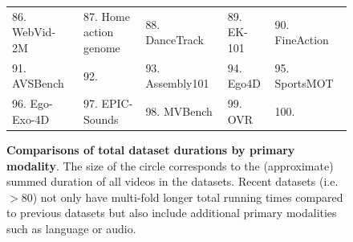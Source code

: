\documentclass[smallextended,twocolumn,natbib]{svjour3}
\begin{document}
\begin{figure}[t]
{\begin{tabular}{lllll}
      86. WebVid-2M~\citep{bain2021frozen} &
      87. Home action genome~\citep{rai2021home} & 
      88. DanceTrack~\citep{sun2022dancetrack} &
      89. EK-101~\citep{damen2022rescaling} &
      90. FineAction~\citep{liu2022fineaction} \\
      91. AVSBench~\citep{zhou2022audio} &
      92. \citet{li2022neural} &
      93. Assembly101~\citep{sener2022assembly101} &
      94. Ego4D \citep{grauman2022ego4d} &
      95. SportsMOT~\citep{cui2023sportsmot} \\
      96. Ego-Exo-4D \citep{grauman2024ego} & 
      97. EPIC-Sounds \citep{huh2023epic} &
      98. MVBench \citep{li2024mvbench} &
      99. OVR \citep{dwibedi2024ovr} &
      100. \citet{yang2024vidchapters}
    \end{tabular}
    }
    \caption{\textbf{Comparisons of total dataset durations by primary modality}. The size of the circle corresponds to the (approximate) summed duration of all videos in the datasets. Recent datasets (i.e. $>80$) not only have multi-fold longer total running times compared to previous datasets but also include additional primary modalities such as language or audio.}
\end{figure}
\end{document}
